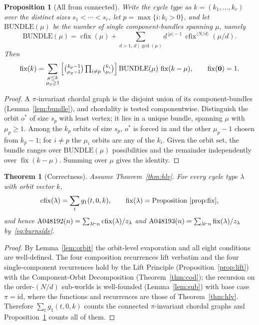 \documentclass[11pt]{article}
\theoremstyle{plain}
\newtheorem{theorem}{Theorem}
\newtheorem{proposition}{Proposition}
\theoremstyle{definition}
\DeclareMathOperator{\fix}{fix}
\DeclareMathOperator{\cfix}{cfix}
\begin{document}
\begin{proposition}[All from connected]\label{prop:fix}
Write the cycle type as $k=(k_1,\dots,k_r)$ over the distinct sizes $s_1<\cdots<s_r$, let
$p=\max\{i:k_i>0\}$, and let $\mathrm{BUNDLE}(\mu)$ be the number of single component-bundles
spanning $\mu$, namely
\[
\mathrm{BUNDLE}(\mu)=\cfix(\mu)+\sum_{d>1,\,d\mid\gcd(\mu)}d^{\,|\mu|-1}\,\cfix^{\langle N/d\rangle}(\mu/d).
\]
Then
\[
\fix(k)=\sum_{\substack{\mu\le k\\ \mu_p\ge1}}\Big[\tbinom{k_p-1}{\mu_p-1}\textstyle\prod_{i\ne p}\binom{k_i}{\mu_i}\Big]\,
   \mathrm{BUNDLE}(\mu)\,\fix(k-\mu),\qquad \fix(\mathbf 0)=1.
\]
\end{proposition}

\begin{proof}
A $\pi$-invariant chordal graph is the disjoint union of its component-bundles
(Lemma~\ref{lem:bundle}), and chordality is tested componentwise. Distinguish the orbit $o^\ast$ of
size $s_p$ with least vertex; it lies in a unique bundle, spanning $\mu$ with $\mu_p\ge1$. Among the
$k_p$ orbits of size $s_p$, $o^\ast$ is forced in and the other $\mu_p-1$ chosen from $k_p-1$; for
$i\ne p$ the $\mu_i$ orbits are any of the $k_i$. Given the orbit set, the bundle ranges over
$\mathrm{BUNDLE}(\mu)$ possibilities and the remainder independently over $\fix(k-\mu)$. Summing over
$\mu$ gives the identity.
\end{proof}

\begin{theorem}[Correctness]\label{thm:correct}
Assume Theorem~\ref{thm:hlv}. For every cycle type $\lambda$ with orbit vector $k$,
\[
\cfix(\lambda)=\sum_t g_1(t,0,k),\qquad
\fix(\lambda)=\text{Proposition~\ref{prop:fix}},
\]
and hence $\textup{A048192}(n)=\sum_{\lambda\vdash n}\cfix(\lambda)/z_\lambda$ and
$\textup{A048193}(n)=\sum_{\lambda\vdash n}\fix(\lambda)/z_\lambda$ by~\eqref{eq:burnside}.
\end{theorem}

\begin{proof}
By Lemma~\ref{lem:orbit} the orbit-level evaporation and all eight conditions are well-defined. The
four composition recurrences lift verbatim and the four single-component recurrences hold by the
Lift Principle (Proposition~\ref{prop:lift}) with the Component-Orbit Decomposition
(Theorem~\ref{thm:cod}); the recursion on the order-$(N/d)$ sub-worlds is well-founded
(Lemma~\ref{lem:sub}) with base case $\pi=\mathrm{id}$, where the functions and recurrences are those
of Theorem~\ref{thm:hlv}. Therefore $\sum_t g_1(t,0,k)$ counts the connected $\pi$-invariant chordal
graphs and Proposition~\ref{prop:fix} counts all of them.
\end{proof}
\end{document}
